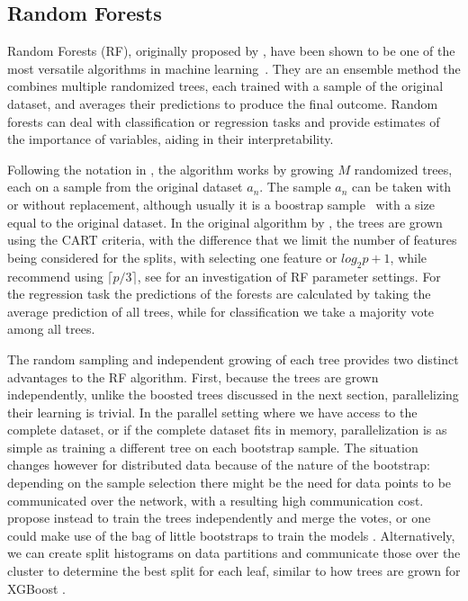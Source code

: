 \subsection{Random Forests}
\label{sec:bg-dt-random-forests}

Random Forests (RF), originally proposed by \citet{random-forests}, have been shown to be one of the
most versatile algorithms in machine learning~\cite{hundreds-classifiers}. They are an
ensemble method the combines multiple randomized trees, each trained with a sample
of the original dataset, and averages their predictions to produce the final outcome.
Random forests can deal with classification or regression tasks and provide estimates
of the importance of variables, aiding in their interpretability.

Following the notation in \cite{random-forest-survey}, the algorithm works by growing
$M$ randomized trees, each on a sample from the original dataset $a_n$. The sample
$a_n$ can be taken with or without replacement, although usually it is a boostrap
sample~\cite{bootstrap} with a size equal to the original dataset. In the original
algorithm by \citeauthor{random-forests}, the trees are grown using the CART criteria, with the difference that we limit the number of features being
considered for the splits, with \citeauthor{random-forests} selecting one feature or
$log_2{p} + 1$, while \citeauthor{random-forest-survey} recommend using $\lceil p/3 \rceil$,
see \cite{rf-parameters} for an investigation of RF parameter settings.
For the regression task the predictions of the forests are calculated
by taking the average prediction of all trees, while for classification
we take a majority vote among all trees.

The random sampling and independent growing of each tree provides two distinct advantages
to the RF algorithm. First, because the trees are grown independently, unlike the boosted trees
discussed in the next section, parallelizing their learning is trivial. In the parallel
setting where we have access to the complete dataset, or if the complete dataset
fits in memory, parallelization is as simple as training a different tree on
each bootstrap sample. The situation changes
however for distributed data because of the nature of the bootstrap: depending
on the sample selection there might be the need for data points to be communicated
over the network, with a resulting high communication cost.
\citet{ensembles-bites} propose instead to train the trees independently
and merge the votes, or one could make use of the bag of little bootstraps
to train the models \cite{bag-of-boostraps}. Alternatively, we can create split
histograms on data partitions and communicate those over the cluster to determine the
best split for each leaf, similar to how trees are grown for XGBoost \cite{xgboost}.

